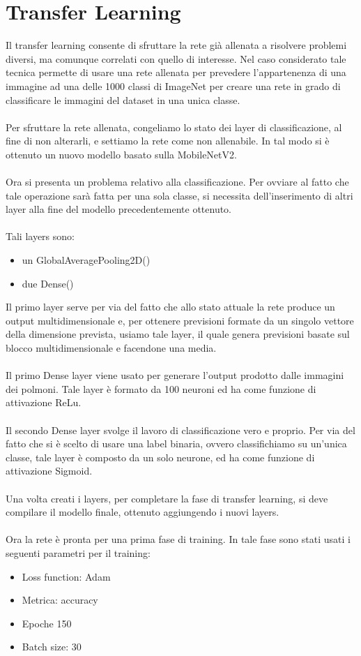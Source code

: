 \section{Transfer Learning}

Il transfer learning consente di sfruttare la rete già allenata a risolvere problemi diversi, ma comunque correlati con quello di interesse.
Nel caso considerato tale tecnica permette di usare una rete allenata per prevedere l'appartenenza di una immagine ad una delle 1000 classi di ImageNet
per creare una rete in grado di classificare le immagini del dataset in una unica classe.
\\\\
Per sfruttare la rete allenata, congeliamo lo stato dei layer di classificazione, al fine di non alterarli, e settiamo la rete come non allenabile.
In tal modo si è ottenuto un nuovo modello basato sulla MobileNetV2.
\\\\
Ora si presenta un problema relativo alla classificazione. Per ovviare al fatto che tale operazione sarà fatta per una sola classe, si necessita dell'inserimento di altri layer alla fine del modello precedentemente ottenuto.
\\\\
Tali layers sono:
\begin{itemize}
    \item un GlobalAveragePooling2D()
    \item due Dense() 
\end{itemize}  

Il primo layer serve per via del fatto che allo stato attuale la rete produce un output multidimensionale e, per ottenere previsioni formate da un singolo vettore 
della dimensione prevista, usiamo tale layer, il quale genera previsioni basate sul blocco multidimensionale e facendone una media.
\\\\
Il primo Dense layer viene usato per generare l'output prodotto dalle immagini dei polmoni. Tale layer è formato da 100 neuroni ed ha come funzione di attivazione ReLu.
\\\\
Il secondo Dense layer svolge il lavoro di classificazione vero e proprio. Per via del fatto che si è scelto di usare una label binaria, ovvero classifichiamo su un'unica classe, tale 
layer è composto da un solo neurone, ed ha come funzione di attivazione Sigmoid.
\\\\
Una volta creati i layers, per completare la fase di transfer learning, si deve compilare il modello finale, ottenuto aggiungendo i nuovi layers.
\\\\
Ora la rete è pronta per una prima fase di training. In tale fase sono stati usati i seguenti parametri per il training:
\begin{itemize}
    \item Loss function: Adam
    \item Metrica: accuracy
    \item Epoche 150
    \item Batch size: 30
\end{itemize}
